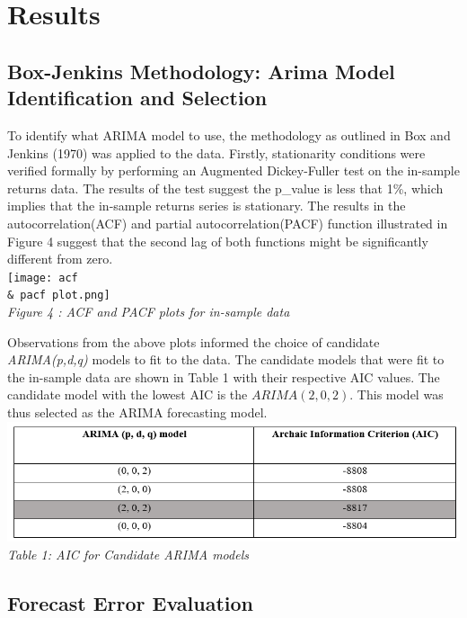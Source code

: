 \documentclass[12pt,a4paper]{article}
\numberwithin{equation}{section}
\numberwithin{figure}{section}
\numberwithin{table}{section}
\begin{document}
\section{Results}\label{results}

\subsection{Box-Jenkins Methodology: Arima Model Identification and
Selection}\label{box-jenkins-methodology-arima-model-identification-and-selection}

To identify what ARIMA model to use, the methodology as outlined in Box
and Jenkins (1970) was applied to the data. Firstly, stationarity
conditions were verified formally by performing an Augmented
Dickey-Fuller test on the in-sample returns data. The results of the
test suggest the p\_value is less that 1\%, which implies that the
in-sample returns series is stationary. The results in the
autocorrelation(ACF) and partial autocorrelation(PACF) function
illustrated in Figure 4 suggest that the second lag of both functions
might be significantly different from zero.\\
\texttt{[image: acf \\\& pacf plot.png]}\\
\emph{Figure 4 : ACF and PACF plots for in-sample data}

Observations from the above plots informed the choice of candidate
\emph{ARIMA(p,d,q)} models to fit to the data. The candidate models that
were fit to the in-sample data are shown in Table 1 with their
respective AIC values. The candidate model with the lowest AIC is the
\(ARIMA(2,0,2)\). This model was thus selected as the ARIMA forecasting
model.\\
\includegraphics[width=1.00000\textwidth]{AIC.png}\\
\emph{Table 1: AIC for Candidate ARIMA models}

\subsection{Forecast Error Evaluation}\label{forecast-error-evaluation}
\end{document}
